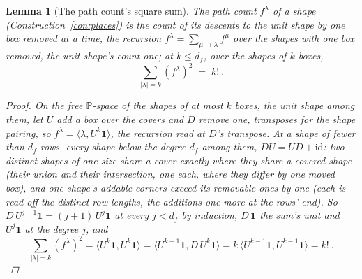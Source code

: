 \documentclass[11pt]{article}
\newtheorem{lemma}{Lemma}
\theoremstyle{definition}
\begin{document}
\begin{lemma}[The path count's square sum]\label{lem:pathsquare}
The \emph{path count} $f^\lambda$ of a shape
(Construction~\ref{con:places}) is the count of its descents to the
unit shape by one box removed at a time, the recursion
$f^\lambda=\sum_{\mu\to\lambda}f^\mu$ over the shapes with one box
removed, the unit shape's count one; at $k\le d_f$, over the shapes
of $k$ boxes,
\[
\sum_{|\lambda|=k}(f^\lambda)^2\;=\;k!\ .
\]
\begin{proof}
On the free $\mathbb P$-space of the shapes of at most $k$ boxes,
the unit shape among them, let $U$ add a box over the covers and
$D$ remove one, transposes for the shape pairing, so
$f^\lambda=\langle\lambda,U^k\mathbf 1\rangle$, the recursion read
at $D$'s transpose. At a shape of fewer than $d_f$ rows, every
shape below the degree $d_f$ among them, $DU=UD+\mathrm{id}$: two
distinct shapes of one size share a cover exactly where they share
a covered shape (their union and their intersection, one each,
where they differ by one moved box), and one shape's addable
corners exceed its removable ones by one (each is read off the
distinct row lengths, the additions one more at the rows' end). So
$D\,U^{j+1}\mathbf 1=(j+1)\,U^{j}\mathbf 1$ at every $j<d_f$ by
induction, $D\,\mathbf 1$ the sum's unit and $U^{j}\mathbf 1$ at
the degree $j$, and
\[
\sum_{|\lambda|=k}(f^\lambda)^2
=\langle U^k\mathbf 1,U^k\mathbf 1\rangle
=\langle U^{k-1}\mathbf 1,D\,U^k\mathbf 1\rangle
=k\,\langle U^{k-1}\mathbf 1,U^{k-1}\mathbf 1\rangle
=k!\ .
\]
\end{proof}
\end{lemma}
\end{document}
